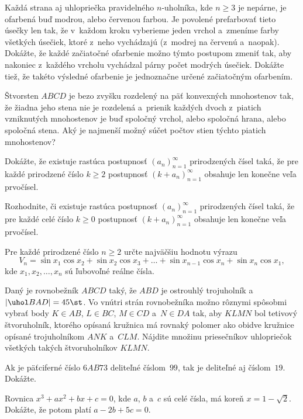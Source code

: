 {%
Každá strana aj uhlopriečka pravidelného $n$-uholníka,
kde $n\ge3$ je nepárne, je ofarbená buď modrou, alebo červenou
farbou. Je povolené prefarbovať tieto úsečky len tak, že
v~každom kroku vyberieme jeden vrchol a~zmeníme farby všetkých úsečiek,
ktoré z~neho vychádzajú (z~modrej na červenú a~naopak). Dokážte, že
každé začiatočné ofarbenie možno týmto postupom zmeniť tak, aby nakoniec
z~každého vrcholu vychádzal párny počet modrých úsečiek. Dokážte
tiež, že takéto výsledné ofarbenie je jednoznačne určené začiatočným
ofarbením.
}

{%
Štvorsten $ABCD$ je bezo zvyšku rozdelený na päť konvexných
mnohostenov tak, že žiadna jeho stena nie je rozdelená a~prienik
každých dvoch z~piatich vzniknutých mnohostenov je buď spoločný vrchol,
alebo spoločná hrana, alebo spoločná stena. Aký je najmenší možný
súčet počtov stien týchto piatich mnohostenov?}

{%
Dokážte, že existuje rastúca postupnosť $(a_n)_{n=1}^{\infty}$
prirodzených čísel taká, že pre každé prirodzené číslo $k\ge2$
postupnosť $(k+a_n)_{n=1}^{\infty}$ obsahuje len konečne veľa
prvočísel.

Rozhodnite, či existuje rastúca postupnosť $(a_n)_{n=1}^{\infty}$
prirodzených čísel taká, že pre každé celé číslo $k\ge0$
postupnosť $(k+a_n)_{n=1}^{\infty}$ obsahuje len konečne veľa
prvočísel.}

{%
Pre každé prirodzené číslo $n\ge2$ určte najväčšiu
hodnotu výrazu
$$
V_n=\sin x_1\cos x_2+\sin x_2\cos x_3+\dots+\sin x_{n-1}\cos x_n+
\sin x_n\cos x_1,
$$
kde $x_1,x_2,\dots,x_n$  sú ľubovoľné reálne čísla.
}

{%
Daný je rovnobežník $ABCD$ taký, že $ABD$ je ostrouhlý
trojuholník a~$|\uhol BAD|=45\st$. Vo vnútri strán rovnobežníka
možno rôznymi spôsobmi vybrať body $K\in AB$, $L\in BC$, $M\in CD$
a~$N\in DA$ tak, aby $KLMN$ bol tetivový štvoruholník, ktorého
opísaná kružnica má rovnaký polomer ako obidve kružnice opísané
trojuholníkom $ANK$ a~$CLM$. Nájdite množinu priesečníkov uhlopriečok
všetkých takých štvoruholníkov $KLMN$.
}

{%
Ak je päťciferné číslo $6AB73$ deliteľné číslom~$99$,
tak je deliteľné aj číslom~$19$. Dokážte.}

{%
Rovnica $x^3+ax^2+bx+c=0$, kde $a$, $b$ a~$c$ sú celé
čísla, má koreň $x=1-\sqrt2$. Dokážte, že potom
platí $a-2b+5c=0$.}

